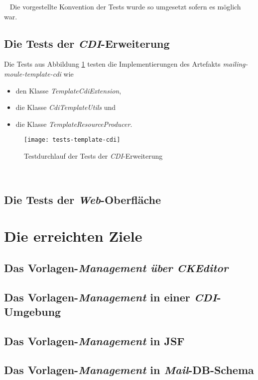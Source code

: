 \ \newline
Die vorgestellte Konvention der Tests wurde so umgesetzt sofern es möglich war. 

\subsection{Die Tests der \emph{CDI}-Erweiterung}
Die Tests aus Abbildung \ref{fig:tests-template-cdi} testen die Implementierungen des Artefakts \emph{mailing-moule-template-cdi} wie
\begin{itemize}
	\item den Klasse \emph{TemplateCdiExtension},
	\item die Klasse \emph{CdiTemplateUtils} und
	\item die Klasse \emph{TemplateResourceProducer}.
\end{itemize}
\begin{figure}[h]
\centering
\texttt{[image: tests-template-cdi]}
\caption{Testdurchlauf der Tests der \emph{CDI}-Erweiterung}
\label{fig:tests-template-cdi}
\end{figure}
\ \newpage

\subsection{Die Tests der \emph{Web}-Oberfläche}


\section{Die erreichten Ziele}

\subsection{Das Vorlagen-\emph{Management über \emph{CKEditor}}}

\subsection{Das Vorlagen-\emph{Management} in einer \emph{CDI}-Umgebung}

\subsection{Das Vorlagen-\emph{Management} in JSF}
\subsection{Das Vorlagen-\emph{Management} in \emph{Mail}-DB-Schema}

